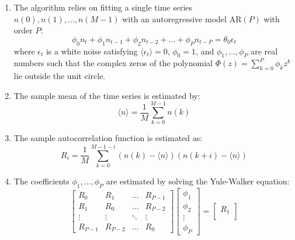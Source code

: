 \begin{enumerate}
  \item The algorithm relies on fitting a single time series $n(0), n(1), \ldots , n(M-1)$ with an autoregressive model $\mathrm{AR}(P)$ with order $P$:
        \begin{equation}
          \label{eq:ar-model}
          \phi_{0}n_{t} + \phi_{1}n_{t-1} + \phi_{2}n_{t-2} + \ldots + \phi_{P}n_{t-P} = \theta_{0}\epsilon_{t}
        \end{equation}
        where $\epsilon_{t}$ is a white noise satisfying $\langle \epsilon_{t} \rangle = 0$,
        $\phi_{0} = 1$, and
        $\phi_{1}, \ldots , \phi_{P}$ are real numbers such that the complex zeros of the polynomial $\Phi (z) = \sum_{k=0}^{P} \phi_{k}z^{k}$ lie outside the unit circle.
  \item The sample mean of the time series is estimated by:
        \begin{equation}
          \label{eq:ar-mean}
          \langle n \rangle = \frac{1}{M} \sum_{k=0}^{M-1}n(k)
        \end{equation}
  \item The sample autocorrelation function is estimated as:
        \begin{equation}
          \label{eq:ar-acf}
          R_{i} = \frac{1}{M} \sum_{k=0}^{M-1-i}(n(k) - \langle n \rangle)(n(k+i) - \langle n \rangle)
        \end{equation}
  \item The coefficients $\phi_{1}, \ldots , \phi_{P}$ are estimated by solving the Yule-Walker equation:
        \begin{equation}
          \label{eq:ar-yule-walker}
          \begin{bmatrix}
            R_{0} & R_{1} & \dots & R_{P-1} \\
            R_{1} & R_{0} & \dots & R_{P-2} \\
            \vdots & \vdots & \ddots & \vdots \\
            R_{P-1} & R_{P-2} & \dots & R_{0}
          \end{bmatrix}
          \begin{bmatrix}
            \phi_{1} \\
            \phi_{2} \\
            \vdots \\
            \phi_{P}
          \end{bmatrix}
          =
          \begin{bmatrix}
            R_{1} \\

\end{bmatrix}
\end{equation}
\end{enumerate}
